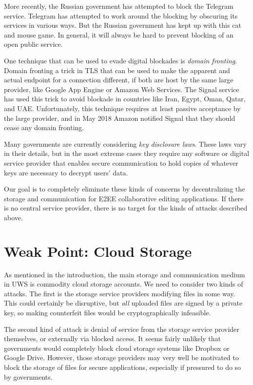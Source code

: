 \documentclass{sig-alternate-hotpets}
\begin{document}
More recently, the Russian government has attempted to block the Telegram service.
Telegram has attempted to work around the blocking by obscuring its services in various ways.
But the Russian government has kept up with this cat and mouse game.
In general, it will always be hard to prevent blocking of an open public service.

One technique that can be used to evade digital blockades is \emph{domain fronting}.
Domain fronting a trick in TLS that can be used to make the apparent and actual endpoint for a connection different, if both are host by the same large provider, like Google App Engine or Amazon Web Services.
The Signal service has used this trick to avoid blockade in countries like Iran, Egypt, Oman, Qatar, and UAE.
Unfortunately, this technique requires at least passive acceptance by the large provider, and in May 2018 Amazon notified Signal that they should cease any domain fronting.

Many governments are currently considering \emph{key disclosure laws}.
These laws vary in their details, but in the most extreme cases they require any software or digital service provider that enables secure communication to hold copies of whatever keys are necessary to decrypt users' data.

Our goal is to completely eliminate these kinds of concerns by decentralizing the storage and communication for E2EE collaborative editing applications.
If there is no central service provider, there is no target for the kinds of attacks described above.

\section{Weak Point: Cloud Storage}

As mentioned in the introduction, the main storage and communication medium in UWS is commodity cloud storage accounts.
We need to consider two kinds of attacks.
The first is the storage service providers modifying files in some way.
This could certainly be disruptive, but \emph{all} uploaded files are signed by a private key, so making counterfeit files would be cryptographically infeasible.

The second kind of attack is denial of service from the storage service provider themselves, or externally via blocked access.
It seems fairly unlikely that governments would completely block cloud storage systems like Dropbox or Google Drive.
However, those storage providers may very well be motivated to block the storage of files for secure applications, especially if pressured to do so by governments.
\end{document}
